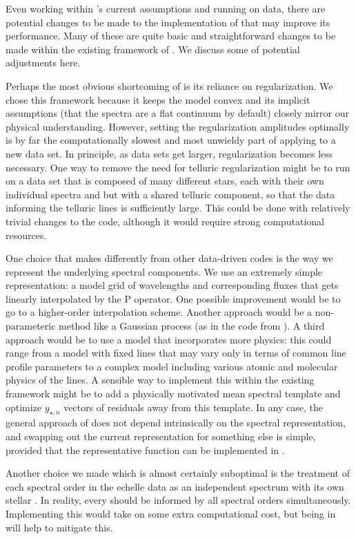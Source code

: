 \documentclass[modern]{aastex62}
\begin{document}
Even working within \wobble's current assumptions and running on \HARPS data, there are potential changes to be made to the implementation of \wobble that may improve its performance.
Many of these are quite basic and straightforward changes to be made within the existing framework of \wobble.
We discuss some of potential adjustments here.

Perhaps the most obvious shortcoming of \wobble is its reliance on regularization.
We chose this framework because it keeps the model convex and its implicit assumptions (that the spectra are a flat continuum by default) closely mirror our physical understanding.
However, setting the regularization amplitudes optimally is by far the computationally slowest and most unwieldy part of applying \wobble to a new data set.
In principle, as data sets get larger, regularization becomes less necessary.
One way to remove the need for telluric regularization might be to run on a data set that is composed of many different stars, each with their own individual spectra and \RVs but with a shared telluric component, so that the data informing the telluric lines is sufficiently large.
This could be done with relatively trivial changes to the \wobble code, although it would require strong computational resources.

One choice that \wobble makes differently from other data-driven \RV codes is the way we represent the underlying spectral components.
We use an extremely simple representation: a model grid of wavelengths and corresponding fluxes that gets linearly interpolated by the P operator.
One possible improvement would be to go to a higher-order interpolation scheme.
Another approach would be a non-parameteric method like a Gaussian process (as in the  code from \citet{Czekala2017}).
A third approach would be to use a model that incorporates more physics: this could range from a model with fixed lines that may vary only in terms of common line profile parameters to a complex model including various atomic and molecular physics of the lines.
A sensible way to implement this within the existing \wobble framework might be to add a physically motivated mean spectral template and optimize $y_{\star, n}$ vectors of residuals away from this template.
In any case, the general approach of \wobble does not depend intrinsically on the spectral representation, and swapping out the current representation for something else is simple, provided that the representative function can be implemented in \TF.

Another choice we made which is almost certainly suboptimal is the treatment of each spectral order in the echelle data as an independent spectrum with its own stellar \RV.
In reality, every \RV should be informed by all spectral orders simultaneously.
Implementing this would take on some extra computational cost, but being in \TF will help to mitigate this.
\end{document}
